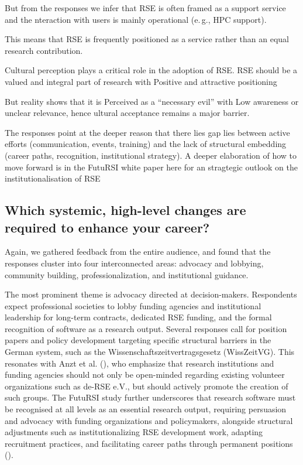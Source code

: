 \documentclass{eceasst}
\newcommand{\eg}{e.\,g.}
\begin{document}
But from the responses we infer that
RSE is often framed as a support service
and the nteraction with users is mainly operational (\eg, HPC support).

This means that RSE is frequently positioned as a service rather than an equal research contribution.


Cultural perception plays a critical role in the adoption of RSE.
RSE should be a  valued and integral part of research
with Positive and attractive positioning

But reality shows that it is
Perceived as a “necessary evil” with Low awareness or unclear relevance,
hence ultural acceptance remains a major barrier.


The responses point at the deeper reason that there lies  gap lies between active efforts (communication, events, training) and the lack of structural embedding (career paths, recognition, institutional strategy).
A deeper elaboration of how to move forward is in the FutuRSI white paper \cite{Mannseicher:2025a} here for an stragtegic outlook on the institutionalisation of RSE


\subsection{Which systemic, high-level changes are required to enhance your career?}


Again, we gathered feedback from the entire audience,
and found that
the responses cluster into four interconnected areas: advocacy and lobbying, community building, professionalization, and institutional guidance.

The most prominent theme is advocacy directed at decision-makers. Respondents expect professional societies to lobby funding agencies and institutional leadership for long-term contracts, dedicated RSE funding, and the formal recognition of software as a research output. Several responses call for position papers and policy development targeting specific structural barriers in the German system, such as the Wissenschaftszeitvertragsgesetz (WissZeitVG). This resonates with Anzt et al. (\cite{Anzt:2020}), who emphasize that research institutions and funding agencies should not only be open-minded regarding existing volunteer organizations such as de-RSE e.V., but should actively promote the creation of such groups. The FutuRSI study further underscores that research software must be recognised at all levels as an essential research output, requiring persuasion and advocacy with funding organizations and policymakers, alongside structural adjustments such as institutionalizing RSE development work, adapting recruitment practices, and facilitating career paths through permanent positions (\cite{Mannseicher:2025a}).
\end{document}
